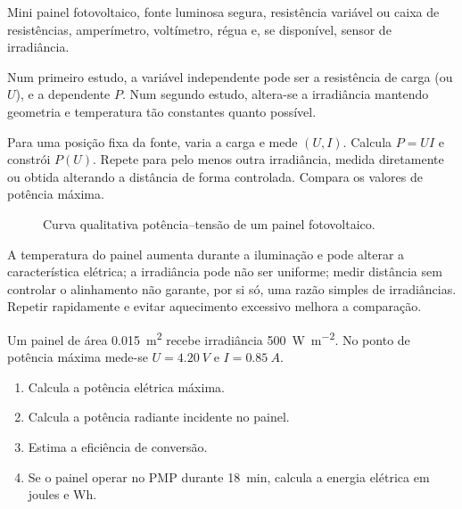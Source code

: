 \documentclass[11pt,a4paper,openany]{book}
\newcounter{exercicio}[chapter]
\renewcommand{\theexercicio}{\thechapter.\arabic{exercicio}}
\newenvironment{exercicio}[1][]%
{\refstepcounter{exercicio}%
\begin{tcolorbox}[breakable,colback=white,colframe=eublue!70,
 title={Exercício \theexercicio\if\relax\detokenize{#1}\relax\else\ --- #1\fi},fonttitle=\bfseries]}%
{\end{tcolorbox}}
\begin{document}
\begin{material}
Mini painel fotovoltaico, fonte luminosa segura, resistência variável ou caixa de resistências, amperímetro, voltímetro, régua e, se disponível, sensor de irradiância.
\end{material}

\begin{variaveis}
Num primeiro estudo, a variável independente pode ser a resistência de carga (ou $U$), e a dependente $P$. Num segundo estudo, altera-se a irradiância mantendo geometria e temperatura tão constantes quanto possível.
\end{variaveis}

\begin{metodo}
Para uma posição fixa da fonte, varia a carga e mede $(U,I)$. Calcula $P=UI$ e constrói $P(U)$. Repete para pelo menos outra irradiância, medida diretamente ou obtida alterando a distância de forma controlada. Compara os valores de potência máxima.
\end{metodo}

\begin{figure}[H]
\centering
{}
\caption{Curva qualitativa potência--tensão de um painel fotovoltaico.}
\end{figure}

\begin{erros}
A temperatura do painel aumenta durante a iluminação e pode alterar a característica elétrica; a irradiância pode não ser uniforme; medir distância sem controlar o alinhamento não garante, por si só, uma razão simples de irradiâncias. Repetir rapidamente e evitar aquecimento excessivo melhora a comparação.
\end{erros}

\begin{exercicio}[Potência, energia e eficiência]
Um painel de área \SI{0.015}{m^2} recebe irradiância \SI{500}{W.m^{-2}}. No ponto de potência máxima mede-se $U=\SI{4.20}{V}$ e $I=\SI{0.85}{A}$.
\begin{enumerate}[label=\alph*)]
\item Calcula a potência elétrica máxima.
\item Calcula a potência radiante incidente no painel.
\item Estima a eficiência de conversão.
\item Se o painel operar no PMP durante \SI{18}{min}, calcula a energia elétrica em joules e Wh.
\end{enumerate}
\end{exercicio}
\end{document}
